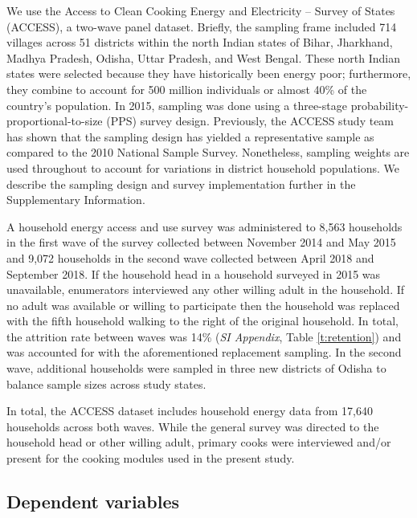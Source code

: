 \documentclass[11pt,english]{article}
\theoremstyle{plain} \newtheorem{claim}{Claim}
\theoremstyle{plain} \newtheorem{prop}{Proposition}
\theoremstyle{plain} \newtheorem{hypo}{Hypothesis}
\begin{document}
We use the Access to Clean Cooking Energy and Electricity -- Survey of States (ACCESS), a two-wave panel dataset\citep{Manietal2018}. Briefly, the sampling frame included 714 villages across 51 districts within the north Indian states of Bihar, Jharkhand, Madhya Pradesh, Odisha, Uttar Pradesh, and West Bengal. These north Indian states were selected because they have historically been energy poor; furthermore, they combine to account for 500 million individuals or almost 40\% of the country's population. In 2015, sampling was done using a three-stage probability-proportional-to-size (PPS) survey design. Previously, the ACCESS study team has shown that the sampling design has yielded a representative sample as compared to the 2010 National Sample Survey\citep{Aklinetal2016}. Nonetheless, sampling weights are used throughout to account for variations in district household populations. We describe the sampling design and survey implementation further in the Supplementary Information. 

A household energy access and use survey was administered to 8,563 households in the first wave of the survey collected between November 2014 and May 2015 and 9,072 households in the second wave collected between April 2018 and September 2018. If the household head in a household surveyed in 2015 was unavailable, enumerators interviewed any other willing adult in the household. If no adult was available or willing to participate then the household was replaced with the fifth household walking to the right of the original household. In total, the attrition rate between waves was 14\% (\textit{SI Appendix}, Table \ref{t:retention}) and was accounted for with the aforementioned replacement sampling. In the second wave, additional households were sampled in three new districts of Odisha to balance sample sizes across study states. 

In total, the ACCESS dataset includes household energy data from 17,640 households across both waves. While the general survey was directed to the household head or other willing adult, primary cooks were interviewed and/or present for the cooking modules used in the present study.


\subsection*{Dependent variables}
\end{document}
